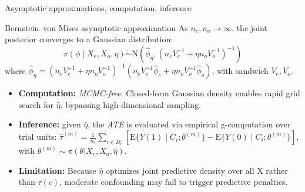 \documentclass[t]{beamer}
\newcommand{\E}{\mathrm{E}}
\begin{document}
\begin{frame}{Asymptotic approximations, computation, inference}
    \vspace{-0.15cm}
    \begin{block}{Bernstein--von Mises asymptotic approximation}
    As $n_e, n_o \to \infty$, the joint posterior converges to a Gaussian distribution:
    \begin{equation*}
        \pi(\phi \mid X_e, X_o, \eta) \mathrel{\dot{\sim}} \text{N}\left(\hat\phi_\eta, \left(n_e V_e^{-1} + \eta n_o V_o^{-1}\right)^{-1}\right)
    \end{equation*}
    where $\hat\phi_\eta = (n_e V_e^{-1} + \eta n_o V_o^{-1})^{-1}(n_e V_e^{-1}\hat\phi_e + \eta n_o V_o^{-1}\hat\phi_o)$, with sandwich $V_e, V_o$.
    \end{block}

    \vspace{0.12cm}
    \begin{itemize}
        \setlength{\itemsep}{0.04cm}
        \item \textbf{Computation:} \emph{MCMC-free}: Closed-form Gaussian density enables rapid grid search for $\hat\eta$, bypassing high-dimensional sampling.
        \item \textbf{Inference:} given $\hat{\eta}$, the \emph{ATE} is evaluated via empirical g-computation over trial units:
        $\hat\tau^{(m)} = \frac{1}{n_e} \sum_{i \in D_e} [ \E\{Y(1) \mid C_i; \theta^{(m)}\} - \E\{Y(0) \mid C_i; \theta^{(m)}\} ]$, with $\theta^{(m)} \sim{\pi(\theta|X_e,X_o, \hat{\eta})}$.
        \item \textbf{Limitation:} Because $\hat{\eta}$ optimizes joint predictive density over all X rather than $\tau(c)$, moderate confounding may fail to trigger predictive penalties.
    \end{itemize}
    
\end{frame}
\end{document}
